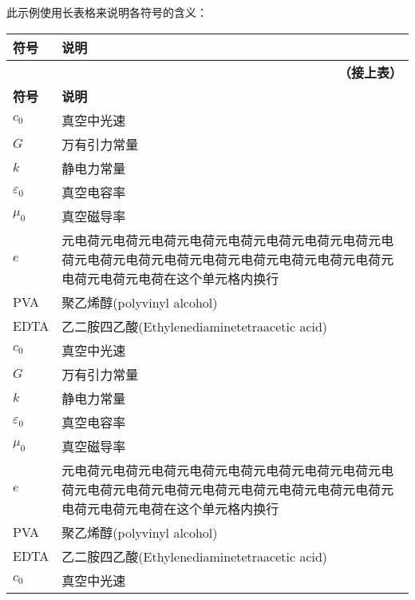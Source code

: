\begin{denotation}
    \label{chap*:deno}
    此示例使用长表格来说明各符号的含义：

\begin{longtable}[c]{p{2.5cm}p{12cm}}
    \toprule
    \textbf{符号} & \textbf{说明} \\* \midrule      %
    \endfirsthead
    \multicolumn{2}{r}{\bfseries （接上表）} \\
    \toprule
    \textbf{符号} & \textbf{说明} \\* \midrule
    \endhead
    \bottomrule
    \endfoot
    \endlastfoot
    $c_0$               & 真空中光速        \\
    $G$                 & 万有引力常量      \\
    $k$                 & 静电力常量        \\
    $\varepsilon _0$    & 真空电容率        \\
    $\mu_0$             & 真空磁导率        \\
    $e$                 & 元电荷元电荷元电荷元电荷元电荷元电荷元电荷元电荷元电荷元电荷元电荷元电荷元电荷元电荷元电荷元电荷元电荷元电荷元电荷元电荷在这个单元格内换行            \\
    PVA                 & 聚乙烯醇(polyvinyl alcohol)\\
    EDTA                & 乙二胺四乙酸(Ethylenediaminetetraacetic acid)\\
    $c_0$               & 真空中光速        \\
    $G$                 & 万有引力常量      \\
    $k$                 & 静电力常量        \\
    $\varepsilon _0$    & 真空电容率        \\
    $\mu_0$             & 真空磁导率        \\
    $e$                 & 元电荷元电荷元电荷元电荷元电荷元电荷元电荷元电荷元电荷元电荷元电荷元电荷元电荷元电荷元电荷元电荷元电荷元电荷元电荷元电荷在这个单元格内换行            \\
    PVA                 & 聚乙烯醇(polyvinyl alcohol)\\
    EDTA                & 乙二胺四乙酸(Ethylenediaminetetraacetic acid)\\
    $c_0$               & 真空中光速        \\

\end{longtable}
\end{denotation}
